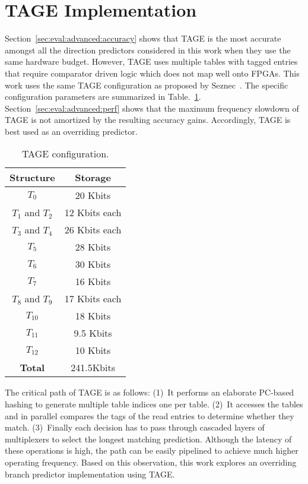 \section{TAGE Implementation}
\label{sec:advanced:tage}
Section~\ref{sec:eval:advanced:accuracy} shows that TAGE is the most accurate amongst all the direction predictors considered in this work when they use the same hardware budget. However, TAGE uses multiple tables with tagged entries that require comparator driven logic which does not map well onto FPGAs. This work uses the same TAGE configuration as proposed by Seznec~\cite{tage}. The specific configuration parameters are summarized in Table.~\ref{tab:tageconfig}. Section~\ref{sec:eval:advanced:perf} shows that the maximum frequency slowdown of TAGE is not amortized by the resulting accuracy gains. Accordingly, TAGE is best used as an overriding predictor.

\begin{table}[h]
\begin{center}
\begin{tabular} {|c|c|}
\hline
\textbf{Structure} & \textbf{Storage} \\ \hline
$T_0$ & 20 Kbits\\
$T_1$ and $T_2$ & 12 Kbits each\\
$T_3$ and $T_4$ & 26 Kbits each\\
$T_5$ & 28 Kbits\\
$T_6$ & 30 Kbits\\
$T_7$ & 16 Kbits\\
$T_8$ and $T_9$ & 17 Kbits each\\
$T_10$ & 18 Kbits\\
$T_11$ & 9.5 Kbits\\
$T_12$ & 10 Kbits\\ \hline
\textbf{Total} & 241.5Kbits \\ \hline
\end{tabular}
\caption{TAGE configuration.\label{tab:tageconfig}}
\end{center}
\end{table}


The critical path of TAGE is as follows: (1)~It performs an elaborate PC-based hashing to generate multiple table indices one per table. (2)~It accesses the tables and in parallel compares the tags of the read entries to determine whether they match. (3)~Finally each decision has to pass through cascaded layers of multiplexers to select the longest matching prediction. Although the latency of these operations is high, the path can be easily pipelined to achieve much higher operating frequency. Based on this observation, this work explores an overriding branch predictor implementation using TAGE.

